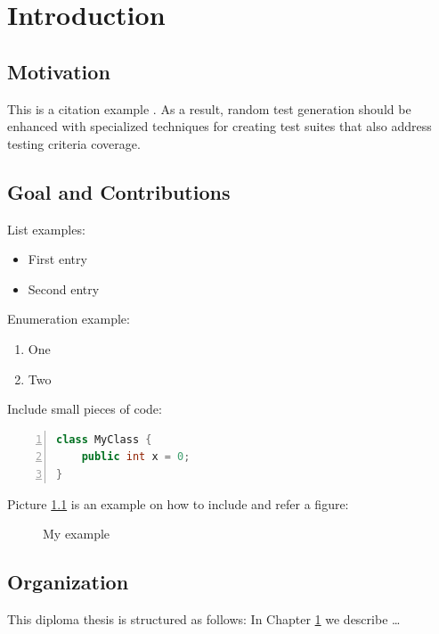 \chapter{Introduction}\label{ch:1}

\section{Motivation}

This is a citation example \cite{DBLP:conf/icse/PachecoLEB07}. 
As a result, random test generation should be enhanced with specialized
techniques for creating test suites that also address testing criteria coverage. 

\section{Goal and Contributions}

List examples:

\begin{itemize}
  \item First entry 
  \item Second entry
\end{itemize}

Enumeration example:

\begin{enumerate}
  \item One
  \item Two
\end{enumerate}

Include small pieces of code:

\small
\begin{lstlisting}[language=Java,numbers=left]
class MyClass {
	public int x = 0;
}
\end{lstlisting}
\normalsize{}

Picture \ref{fig:examplefigure} is an example on how to include and refer a
figure:

\begin{figure}
\centering
{}
\caption{My example\label{fig:examplefigure}}
\end{figure}


\section{Organization}

This diploma thesis is structured as follows: In Chapter \ref{ch:1} we describe
\ldots